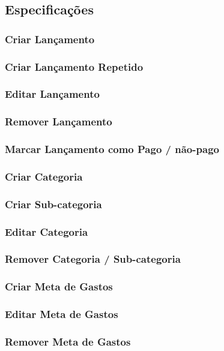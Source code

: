 \documentclass[a4paper]{abnt}
\begin{document}
\subsection{Especificações}

\subsubsection{Criar Lançamento}
\subsubsection{Criar Lançamento Repetido}
\subsubsection{Editar Lançamento}
\subsubsection{Remover Lançamento}
\subsubsection{Marcar Lançamento como Pago / não-pago}
\subsubsection{Criar Categoria}
\subsubsection{Criar Sub-categoria}
\subsubsection{Editar Categoria}
\subsubsection{Remover Categoria / Sub-categoria}
\subsubsection{Criar Meta de Gastos}
\subsubsection{Editar Meta de Gastos}
\subsubsection{Remover Meta de Gastos}
\end{document}
